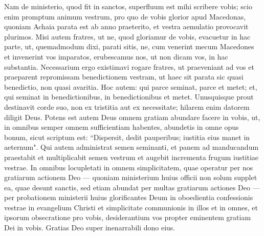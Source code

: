 \begin{biblechapter}  
\verse Nam de ministerio, quod fit in sanctos, superfluum est mihi scribere vobis; 
\verse scio enim promptum animum vestrum, pro quo de vobis glorior apud Macedonas, quoniam Achaia parata est ab anno praeterito, et vestra aemulatio provocavit plurimos. 
\verse Misi autem fratres, ut ne, quod gloriamur de vobis, evacuetur in hac parte, ut, quemadmodum dixi, parati sitis, 
\verse ne, cum venerint mecum Macedones et invenerint vos imparatos, erubescamus nos, ut non dicam vos, in hac substantia. 
\verse Necessarium ergo existimavi rogare fratres, ut praeveniant ad vos et praeparent repromissam benedictionem vestram, ut haec sit parata sic quasi benedictio, non quasi avaritia. 
\verse Hoc autem: qui parce seminat, parce et metet; et, qui seminat in benedictionibus, in benedictionibus et metet. 
\verse Unusquisque prout destinavit corde suo, non ex tristitia aut ex necessitate; hilarem enim datorem diligit Deus. 
\verse Potens est autem Deus omnem gratiam abundare facere in vobis, ut, in omnibus semper omnem sufficientiam habentes, abundetis in omne opus bonum, 
\verse sicut scriptum est: “Dispersit, dedit pauperibus; iustitia eius manet in aeternum". 
\verse Qui autem administrat semen seminanti, et panem ad manducandum praestabit et multiplicabit semen vestrum et augebit incrementa frugum iustitiae vestrae.  
\verse In omnibus locupletati in omnem simplicitatem, quae operatur per nos gratiarum actionem Deo 
\verse — quoniam ministerium huius officii non solum supplet ea, quae desunt sanctis, sed etiam abundat per multas gratiarum actiones Deo — 
\verse per probationem ministerii huius glorificantes Deum in oboedientia confessionis vestrae in evangelium Christi et simplicitate communionis in illos et in omnes, 
\verse et ipsorum obsecratione pro vobis, desiderantium vos propter eminentem gratiam Dei in vobis. 
\verse Gratias Deo super inenarrabili dono eius. 
\end{biblechapter}

